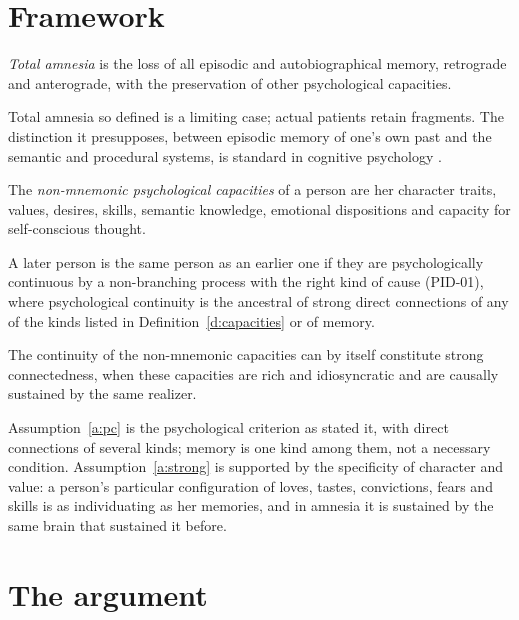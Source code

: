 \documentclass{situationist-preprint}
\begin{document}
\section{Framework}\label{s:frame}

\begin{definition}\label{d:amnesia}
\emph{Total amnesia} is the loss of all episodic and autobiographical memory, retrograde and anterograde, with the preservation of other psychological capacities.
\end{definition}

Total amnesia so defined is a limiting case; actual patients retain fragments. The distinction it presupposes, between episodic memory of one's own past and the semantic and procedural systems, is standard in cognitive psychology \citep{Tulving1985}.

\begin{definition}\label{d:capacities}
The \emph{non-mnemonic psychological capacities} of a person are her character traits, values, desires, skills, semantic knowledge, emotional dispositions and capacity for self-conscious thought.
\end{definition}

\begin{assumption}\label{a:pc}
A later person is the same person as an earlier one if they are psychologically continuous by a non-branching process with the right kind of cause (PID-01), where psychological continuity is the ancestral of strong direct connections of any of the kinds listed in Definition~\ref{d:capacities} or of memory.
\end{assumption}

\begin{assumption}\label{a:strong}
The continuity of the non-mnemonic capacities can by itself constitute strong connectedness, when these capacities are rich and idiosyncratic and are causally sustained by the same realizer.
\end{assumption}

Assumption~\ref{a:pc} is the psychological criterion as \citet{Parfit1984} stated it, with direct connections of several kinds; memory is one kind among them, not a necessary condition. Assumption~\ref{a:strong} is supported by the specificity of character and value: a person's particular configuration of loves, tastes, convictions, fears and skills is as individuating as her memories, and in amnesia it is sustained by the same brain that sustained it before.

\section{The argument}\label{s:arg}
\end{document}

